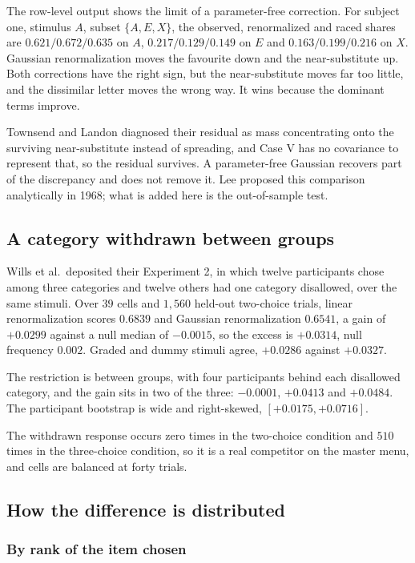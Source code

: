 \documentclass[11pt]{article}
\theoremstyle{italichead}
\begin{document}
The row-level output shows the limit of a parameter-free correction. For subject
one, stimulus $A$, subset $\{A,E,X\}$, the observed, renormalized and raced shares are
$0.621 / 0.672 / 0.635$ on $A$, $0.217 / 0.129 / 0.149$ on $E$ and $0.163 / 0.199 / 0.216$
on $X$. Gaussian renormalization moves the favourite down and the near-substitute up. Both
corrections have the right sign, but the near-substitute moves far too little, and the dissimilar
letter moves the wrong way.
It wins because the dominant terms improve.

Townsend and Landon diagnosed their residual as
mass concentrating onto the surviving near-substitute instead of spreading, and Case V has no
covariance to represent that, so the residual survives. A parameter-free Gaussian recovers
part of the discrepancy and does not remove it. Lee \cite{lee1968} proposed this comparison
analytically in 1968; what is added here is the out-of-sample test.

\subsection{A category withdrawn between groups}
\label{sec:wills}

Wills et al.\ deposited their Experiment 2, in which twelve participants chose among three
categories and twelve others had one category disallowed, over the same stimuli. Over $39$
cells and $1{,}560$ held-out two-choice trials, linear renormalization scores $0.6839$ and Gaussian renormalization
$0.6541$, a gain of $+0.0299$ against a null median of $-0.0015$, so the excess is $+0.0314$,
null frequency $0.002$. Graded and dummy stimuli agree, $+0.0286$ against $+0.0327$.

The restriction is between groups, with four participants behind each disallowed category, and
the gain sits in two of the three: $-0.0001$, $+0.0413$ and $+0.0484$. The participant
bootstrap is wide and right-skewed, $[+0.0175, +0.0716]$.

The withdrawn response occurs zero times in the two-choice condition and $510$ times in the
three-choice condition, so it is a real competitor on the master menu, and cells are balanced
at forty trials.

\subsection{How the difference is distributed}
\label{sec:distribution}

\subsubsection{By rank of the item chosen}
\label{sec:where}
\end{document}
